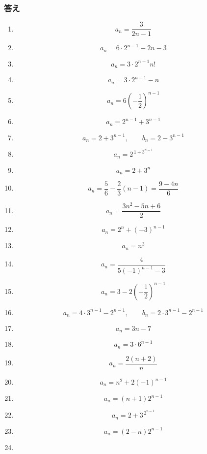 \subsubsection{答え}\label{節：標準：答え}
\begin{enumerate}[label=\textbf{問\arabic*.},leftmargin=3.8em,format=\bookitemlink{practice-basic}{answer}{solution}]
  \item \[
      a_n=\frac{3}{2n-1}
    \]
  \item \[
      a_n=6\cdot2^{n-1}-2n-3
    \]
  \item \[
      a_n=3\cdot2^{n-1}n!
    \]
  \item \[
      a_n=3\cdot2^{n-1}-n
    \]
  \item \[
      a_n=6\left(-\frac12\right)^{n-1}
    \]
  \item \[
      a_n=2^{n-1}+3^{n-1}
    \]
  \item \[
      a_n=2+3^{n-1},\qquad b_n=2-3^{n-1}
    \]
  \item \[
      a_n=2^{\,1+3^{n-1}}
    \]
  \item \[
      a_n=2+3^n
    \]
  \item \[
      a_n=\frac56-\frac23(n-1)=\frac{9-4n}{6}
    \]
  \item \[
      a_n=\frac{3n^2-5n+6}{2}
    \]
  \item \[
      a_n=2^n+(-3)^{n-1}
    \]
  \item \[
      a_n=n^3
    \]
  \item \[
      a_n=\frac4{5(-1)^{n-1}-3}
    \]
  \item \[
      a_n=3-2\left(-\frac12\right)^{n-1}
    \]
  \item \[
      a_n=4\cdot3^{n-1}-2^{n-1},\qquad b_n=2\cdot3^{n-1}-2^{n-1}
    \]
  \item \[
      a_n=3n-7
    \]
  \item \[
      a_n=3\cdot6^{n-1}
    \]
  \item \[
      a_n=\frac{2(n+2)}n
    \]
  \item \[
      a_n=n^2+2(-1)^{n-1}
    \]
  \item \[
      a_n=(n+1)2^{n-1}
    \]
  \item \[
      a_n=2+3^{\,2^{n-1}}
    \]
  \item \[
      a_n=(2-n)2^{n-1}
    \]
  \item \[
\]
\end{enumerate}
